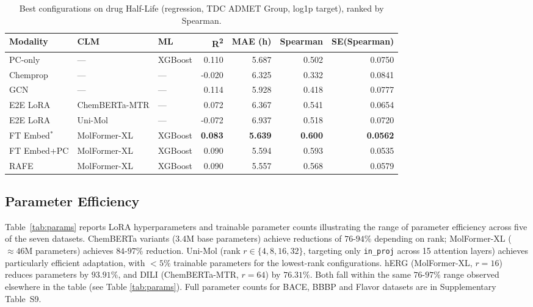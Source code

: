 \documentclass[final,1p,times]{elsarticle}
\begin{document}
\begin{table}[!ht]
\centering
\caption{Best configurations on drug Half-Life (regression, TDC ADMET Group, log1p target), ranked by Spearman.}
\label{tab:half_life}
\begin{adjustbox}{max width=\textwidth}
\begin{tabular}{lllrrrr}
\toprule
Modality & CLM & ML & R\textsuperscript{2} & MAE (h) & Spearman & SE(Spearman) \\
\midrule
PC-only     & --- & XGBoost & 0.110 & 5.687 & 0.502 & 0.0750 \\
Chemprop    & --- & --- & -0.020 & 6.325 & 0.332 & 0.0841 \\
GCN         & --- & --- & 0.114 & 5.928 & 0.418 & 0.0777 \\
\midrule
E2E LoRA    & ChemBERTa-MTR & --- & 0.072 & 6.367 & 0.541 & 0.0654 \\
E2E LoRA    & Uni-Mol       & --- & -0.072 & 6.937 & 0.518 & 0.0720 \\
\midrule
FT Embed$^*$& MolFormer-XL & XGBoost & \textbf{0.083} & \textbf{5.639} & \textbf{0.600} & \textbf{0.0562} \\
FT Embed+PC & MolFormer-XL & XGBoost & 0.090 & 5.594 & 0.593 & 0.0535 \\
RAFE        & MolFormer-XL & XGBoost & 0.090 & 5.557 & 0.568 & 0.0579 \\
\bottomrule
\end{tabular}
\end{adjustbox}
\end{table}

\subsection{Parameter Efficiency}
Table~\ref{tab:params} reports LoRA hyperparameters and trainable parameter counts illustrating the range of parameter efficiency across five of the seven datasets. ChemBERTa variants (3.4M base parameters) achieve reductions of $76$-$94\%$ depending on rank; MolFormer-XL ($\approx 46$M parameters) achieves $84$-$97\%$ reduction. Uni-Mol (rank $r \in \{4,8,16,32\}$, targeting only \texttt{in\_proj} across 15 attention layers) achieves particularly efficient adaptation, with $<5\%$ trainable parameters for the lowest-rank configurations. hERG (MolFormer-XL, $r=16$) reduces parameters by $93.91\%$, and DILI (ChemBERTa-MTR, $r=64$) by $76.31\%$. Both fall within the same $76$-$97\%$ range observed elsewhere in the table (see Table \ref{tab:params}). Full parameter counts for BACE, BBBP and Flavor datasets are in Supplementary Table~S9.
\end{document}
